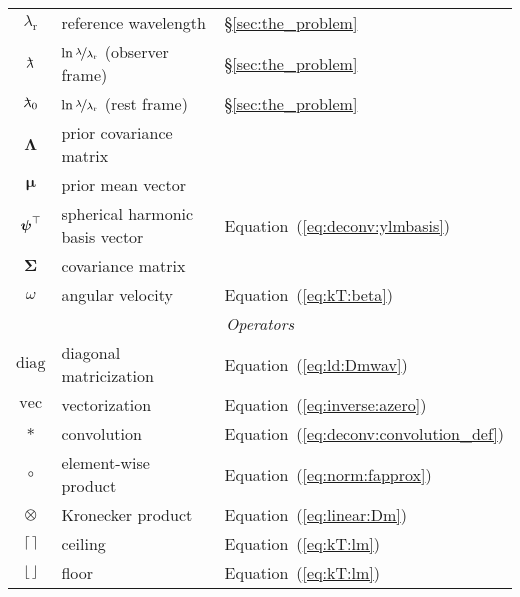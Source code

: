 \documentclass[modern]{aastex62}
\begin{document}
\begin{center}
\begin{longtable}{cll}
    $\lambda_\mathrm{r}$     & reference wavelength                                  & \S\ref{sec:the_problem}\\
    $\lnlam$                 & $\ln\nicefrac{\lambda}{\lambda_\mathrm{r}}$ (observer frame)  & \S\ref{sec:the_problem}\\
    $\lnlam_0$               & $\ln\nicefrac{\lambda}{\lambda_\mathrm{r}}$ (rest frame)      & \S\ref{sec:the_problem}\\
    $\boldsymbol{\Lambda}$   & prior covariance matrix                               & \\
    $\boldsymbol{\mu}$       & prior mean vector                                     & \\
    $\ylmbasis$              & spherical harmonic basis vector                       & Equation~(\ref{eq:deconv:ylmbasis})\\
    $\boldsymbol{\Sigma}$    & covariance matrix                                     & \\
    $\omega$                 & angular velocity                                      & Equation~(\ref{eq:kT:beta})\\
    \midrule
    \multicolumn{3}{c}{\emph{Operators}}\\
    \midrule
    $\mathrm{diag}$          & diagonal matricization                                & Equation~(\ref{eq:ld:Dmwav})\\
    $\mathrm{vec}$           & vectorization                                         & Equation~(\ref{eq:inverse:azero})\\
    $*$                      & convolution                                           & Equation~(\ref{eq:deconv:convolution_def})\\
    $\circ$                  & element-wise product                                  & Equation~(\ref{eq:norm:fapprox})\\
    $\otimes$                & Kronecker product                                     & Equation~(\ref{eq:linear:Dm})\\
    $\ceil*{\,}$             & ceiling                                               & Equation~(\ref{eq:kT:lm})\\
    $\floor*{\,}$            & floor                                                 & Equation~(\ref{eq:kT:lm})
\end{longtable}
\end{center}

\clearpage

\end{document}

